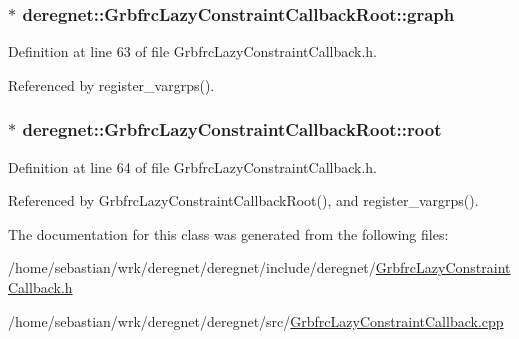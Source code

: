 \subsubsection[{\texorpdfstring{graph}{graph}}]{$\ast$ deregnet\+::\+Grbfrc\+Lazy\+Constraint\+Callback\+Root\+::graph\hspace{0.3cm}{\ttfamily [private]}}\hypertarget{classderegnet_1_1GrbfrcLazyConstraintCallbackRoot_a93e8aeef7796880ba2efa59770ed98ad}{}\label{classderegnet_1_1GrbfrcLazyConstraintCallbackRoot_a93e8aeef7796880ba2efa59770ed98ad}


Definition at line 63 of file Grbfrc\+Lazy\+Constraint\+Callback.\+h.



Referenced by register\+\_\+vargrps().

\subsubsection[{\texorpdfstring{root}{root}}]{$\ast$ deregnet\+::\+Grbfrc\+Lazy\+Constraint\+Callback\+Root\+::root\hspace{0.3cm}{\ttfamily [private]}}\hypertarget{classderegnet_1_1GrbfrcLazyConstraintCallbackRoot_a49a59d875ea23a1b443ec39b3c221e4d}{}\label{classderegnet_1_1GrbfrcLazyConstraintCallbackRoot_a49a59d875ea23a1b443ec39b3c221e4d}


Definition at line 64 of file Grbfrc\+Lazy\+Constraint\+Callback.\+h.



Referenced by Grbfrc\+Lazy\+Constraint\+Callback\+Root(), and register\+\_\+vargrps().



The documentation for this class was generated from the following files\+:\begin{DoxyCompactItemize}
\item 
/home/sebastian/wrk/deregnet/deregnet/include/deregnet/\hyperlink{GrbfrcLazyConstraintCallback_8h}{Grbfrc\+Lazy\+Constraint\+Callback.\+h}\item 
/home/sebastian/wrk/deregnet/deregnet/src/\hyperlink{GrbfrcLazyConstraintCallback_8cpp}{Grbfrc\+Lazy\+Constraint\+Callback.\+cpp}\end{DoxyCompactItemize}
